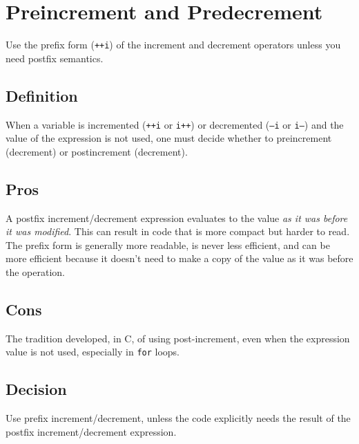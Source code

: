 
\section{Preincrement and Predecrement}\label{sec:preincrement-and-predecrement}
Use the prefix form (\texttt{++i}) of the increment and decrement operators unless you need postfix semantics.

\subsection{Definition}
When a variable is incremented (\texttt{++i} or \texttt{i++}) or decremented (\texttt{--i} or \texttt{i--}) and the value of the expression is not used, one must decide whether to preincrement (decrement) or postincrement (decrement).

\subsection{Pros}
A postfix increment/decrement expression evaluates to the value \emph{as it was before it was modified}. This can result in code that is more compact but harder to read. The prefix form is generally more readable, is never less efficient, and can be more efficient because it doesn't need to make a copy of the value as it was before the operation.

\subsection{Cons}
The tradition developed, in C, of using post-increment, even when the expression value is not used, especially in \texttt{for} loops.

\subsection{Decision}
Use prefix increment/decrement, unless the code explicitly needs the result of the postfix increment/decrement expression.
